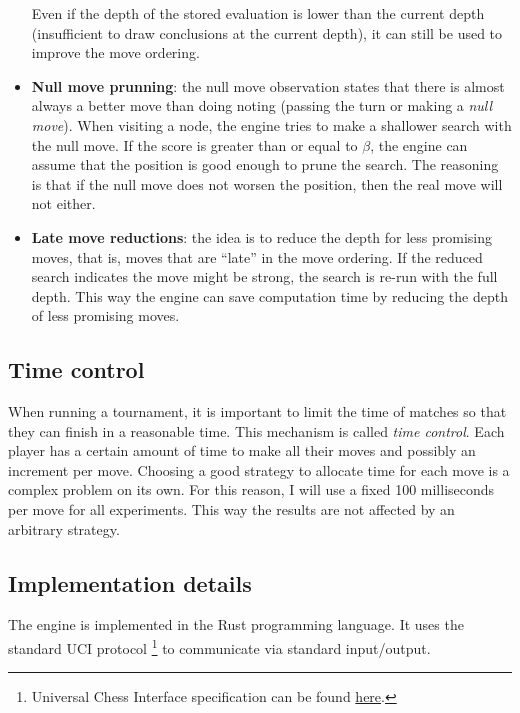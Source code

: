\begin{itemize}
Even if the depth of the stored evaluation is lower than the current depth (insufficient to draw conclusions at the current depth), it can still be used to improve the move ordering.

\item \textbf{Null move prunning}: the null move observation states that there is almost always a better move than doing noting (passing the turn or making a \textit{null move}). When visiting a node, the engine tries to make a shallower search with the null move. If the score is greater than or equal to $\beta$, the engine can assume that the position is good enough to prune the search. The reasoning is that if the null move does not worsen the position, then the real move will not either.

\item \textbf{Late move reductions}: the idea is to reduce the depth for less promising moves, that is, moves that are \enquote{late} in the move ordering. If the reduced search indicates the move might be strong, the search is re-run with the full depth. This way the engine can save computation time by reducing the depth of less promising moves.
\end{itemize}


\subsection{Time control}

When running a tournament, it is important to limit the time of matches so that they can finish in a reasonable time. This mechanism is called \textit{time control}. Each player has a certain amount of time to make all their moves and possibly an increment per move. Choosing a good strategy to allocate time for each move is a complex problem on its own. For this reason, I will use a fixed 100 milliseconds per move for all experiments. This way the results are not affected by an arbitrary strategy.

\subsection{Implementation details}


The engine is implemented in the Rust programming language. It uses the standard UCI protocol \footnote{Universal Chess Interface specification can be found \href{https://www.shredderchess.com/chess-features/uci-universal-chess-interface.html}{here}.} to communicate via standard input/output.


